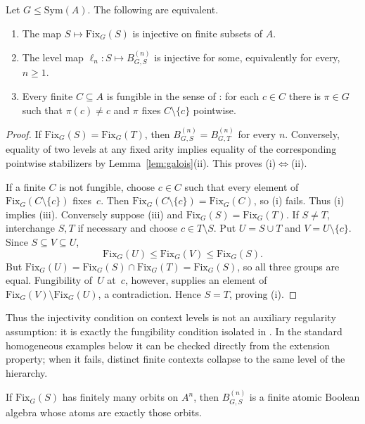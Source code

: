 \documentclass{lmcs}
\newcommand{\Sym}{\mathrm{Sym}}
\newcommand{\Fix}{\mathrm{Fix}}
\begin{document}
\begin{lem}\label{lem:fungible}
Let $G\leq\Sym(A)$. The following are equivalent.
\begin{enumerate}[label=\textup{(\roman*)}]
\item The map $S\mapsto\Fix_G(S)$ is injective on finite subsets of $A$.
\item The level map $\ell_n:S\mapsto B^{(n)}_{G,S}$ is injective for some, equivalently for every, $n\geq1$.
\item Every finite $C\subseteq A$ is fungible in the sense of \cite[Def.~9.6]{BKL14}: for each $c\in C$ there is $\pi\in G$ such that $\pi(c)\neq c$ and $\pi$ fixes $C\setminus\{c\}$ pointwise.
\end{enumerate}
\end{lem}
\begin{proof}
If $\Fix_G(S)=\Fix_G(T)$, then $B^{(n)}_{G,S}=B^{(n)}_{G,T}$ for every $n$. Conversely, equality of two levels at any fixed arity implies equality of the corresponding pointwise stabilizers by Lemma~\ref{lem:galois}(ii). This proves (i)$\Leftrightarrow$(ii).

If a finite $C$ is not fungible, choose $c\in C$ such that every element of $\Fix_G(C\setminus\{c\})$ fixes~$c$. Then $\Fix_G(C\setminus\{c\})=\Fix_G(C)$, so (i) fails. Thus (i) implies (iii). Conversely suppose (iii) and $\Fix_G(S)=\Fix_G(T)$. If $S\neq T$, interchange $S,T$ if necessary and choose $c\in T\setminus S$. Put $U=S\cup T$ and $V=U\setminus\{c\}$. Since $S\subseteq V\subseteq U$,
\[
  \Fix_G(U)\leq\Fix_G(V)\leq\Fix_G(S).
\]
But $\Fix_G(U)=\Fix_G(S)\cap\Fix_G(T)=\Fix_G(S)$, so all three groups are equal. Fungibility of~$U$ at~$c$, however, supplies an element of $\Fix_G(V)\setminus\Fix_G(U)$, a contradiction. Hence $S=T$, proving (i).
\end{proof}

Thus the injectivity condition on context levels is not an auxiliary regularity assumption: it is exactly the fungibility condition isolated in \cite{BKL14}. In the standard homogeneous examples below it can be checked directly from the extension property; when it fails, distinct finite contexts collapse to the same level of the hierarchy.

\begin{lem}\label{lem:atomic}
If $\Fix_G(S)$ has finitely many orbits on $A^n$, then
$B^{(n)}_{G,S}$ is a finite atomic Boolean algebra whose atoms are
exactly those orbits.
\end{lem}
\end{document}
